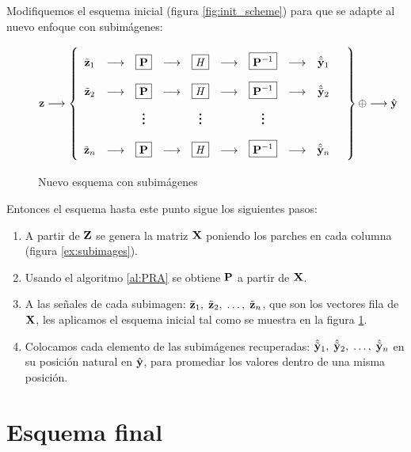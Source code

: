 Modifiquemos el esquema inicial (figura \ref{fig:init_scheme}) para que se adapte al nuevo enfoque con subim\'agenes:

\begin{figure}[h]
	\begin{equation*}
		\z\longrightarrow\left\{
		\def\arraystretch{2.2}
		\begin{array}{ccccccccccc}
			\ztilde_1 & \longrightarrow & \boxed{\P} & \longrightarrow & \boxed{\H} & \longrightarrow & \boxed{\P^{-1}} & \longrightarrow & \yhattilde_1\\
			\ztilde_2 & \longrightarrow & \boxed{\P} & \longrightarrow & \boxed{\H} & \longrightarrow & \boxed{\P^{-1}} & \longrightarrow & \yhattilde_2\\
			& & \huge\vdots &  & \huge\vdots &  & \huge\vdots & & & \\
			\ztilde_n & \longrightarrow & \boxed{\P} & \longrightarrow & \boxed{\H} & \longrightarrow & \boxed{\P^{-1}} & \longrightarrow & \yhattilde_n\\
		\end{array}
		\right\}\oplus\longrightarrow\yhat
	\end{equation*}
	\caption{Nuevo esquema con subim\'agenes}
	\label{fig:subimage_scheme}
\end{figure}

Entonces el esquema hasta este punto sigue los siguientes pasos:

\begin{enumerate}
	\item A partir de $\Z$ se genera la matriz $\X$ poniendo los parches en cada columna (figura \ref{ex:subimages}).
	\item Usando el algoritmo \ref{al:PRA} se obtiene $\P$ a partir de $\X$.
	\item A las señales de cada subimagen: $\ztilde_1,\; \ztilde_2,\; \dots,\; \ztilde_n$, que son los vectores fila de $\X$, les aplicamos el esquema inicial tal como se muestra en la figura \ref{fig:subimage_scheme}.
	\item Colocamos cada elemento de las subim\'agenes recuperadas: $\yhattilde_1,\; \yhattilde_2,\; \dots,\; \yhattilde_n$ en su posici\'on natural en $\yhat$, para promediar los valores dentro de una misma posici\'on.
\end{enumerate}

\section{Esquema final}

